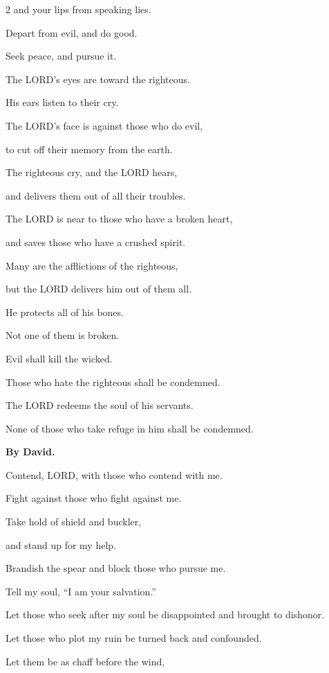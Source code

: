 \begin{multicols}{2}
	and your lips from speaking lies.
	
	
	\myverse{}Depart from evil, and do good.
	
	Seek peace, and pursue it.
	
	
	\myverse{}The LORD’s eyes are toward the righteous.
	
	His ears listen to their cry.
	
	
	\myverse{}The LORD’s face is against those who do evil,
	
	to cut off their memory from the earth.
	
	
	\myverse{}The righteous cry, and the LORD hears,
	
	and delivers them out of all their troubles.
	
	
	\myverse{}The LORD is near to those who have a broken heart,
	
	and saves those who have a crushed spirit.
	
	
	\myverse{}Many are the afflictions of the righteous,
	
	but the LORD delivers him out of them all.
	
	
	\myverse{}He protects all of his bones.
	
	Not one of them is broken.
	
	
	\myverse{}Evil shall kill the wicked.
	
	Those who hate the righteous shall be condemned.
	
	
	\myverse{}The LORD redeems the soul of his servants.
	
	None of those who take refuge in him shall be condemned.
	
	
	\mychapter{}\textbf{By David.}
	
	\quad \myverse*{}Contend, LORD, with those who contend with me.
	
	Fight against those who fight against me.
	
	
	\myverse{}Take hold of shield and buckler,
	
	and stand up for my help.
	
	
	\myverse{}Brandish the spear and block those who pursue me.
	
	Tell my soul, “I am your salvation.”
	
	
	\myverse{}Let those who seek after my soul be disappointed and brought
	to dishonor.
	
	Let those who plot my ruin be turned back and confounded.
	
	
	\myverse{}Let them be as chaff before the wind,
	

\end{multicols}
